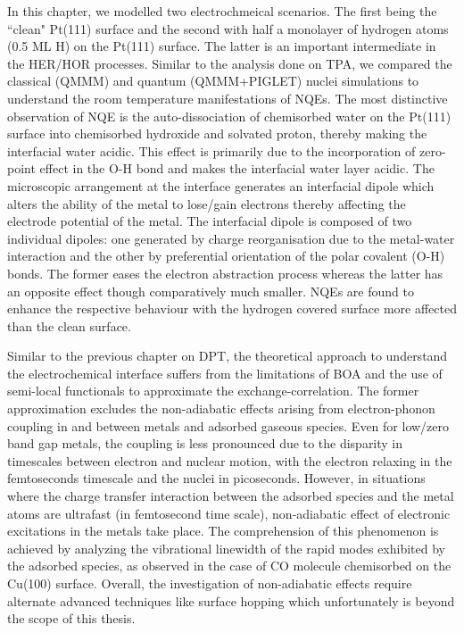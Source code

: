 \noindent In this chapter, we modelled two electrochmeical scenarios. The first being the ``clean" Pt(111) surface and the second with half a monolayer of hydrogen atoms (0.5 ML H) on the Pt(111) surface. The latter is an important intermediate in the HER/HOR processes. Similar to the analysis done on TPA, we compared the classical (QMMM) and quantum (QMMM+PIGLET) nuclei simulations to understand the room temperature manifestations of NQEs. The most distinctive observation of NQE is the auto-dissociation of chemisorbed water on the Pt(111) surface into chemisorbed hydroxide and solvated proton, thereby making the interfacial water acidic. This effect is primarily due to the incorporation of zero-point effect in the O-H bond and makes the interfacial water layer acidic. The microscopic arrangement at the interface generates an interfacial dipole which alters the ability of the metal to lose/gain electrons thereby affecting the electrode potential of the metal. The interfacial dipole is composed of two individual dipoles: one generated by charge reorganisation due to the metal-water interaction and the other by preferential orientation of the polar covalent (O-H) bonds. The former eases the electron abstraction process whereas the latter has an opposite effect though comparatively much smaller. NQEs are found to enhance the respective behaviour with the hydrogen covered surface more affected than the clean surface.

\noindent Similar to the previous chapter on DPT, the theoretical approach to understand the electrochemical interface suffers from the limitations of BOA and the use of semi-local functionals to approximate the exchange-correlation. The former approximation excludes the non-adiabatic effects arising from electron-phonon coupling in and between metals and adsorbed gaseous species\cite{alducin2017non,dou2020nonadiabatic,kroger2006electron}. Even for low/zero band gap metals, the coupling is less pronounced due to the disparity in timescales between electron and nuclear motion, with the electron relaxing in the femtoseconds timescale and the nuclei in picoseconds. However, in situations where the charge transfer interaction between the adsorbed species and the metal atoms are ultrafast (in femtosecond time scale), non-adiabatic effect of electronic excitations in the metals take place. The comprehension of this phenomenon is achieved by analyzing the vibrational linewidth of the rapid modes exhibited by the adsorbed species, as observed in the case of CO molecule chemisorbed on the Cu(100) surface\cite{ryberg1985vibrational}. Overall, the investigation of non-adiabatic effects require alternate advanced techniques like surface hopping\cite{sholl1998generalized} which unfortunately is beyond the scope of this thesis. 

